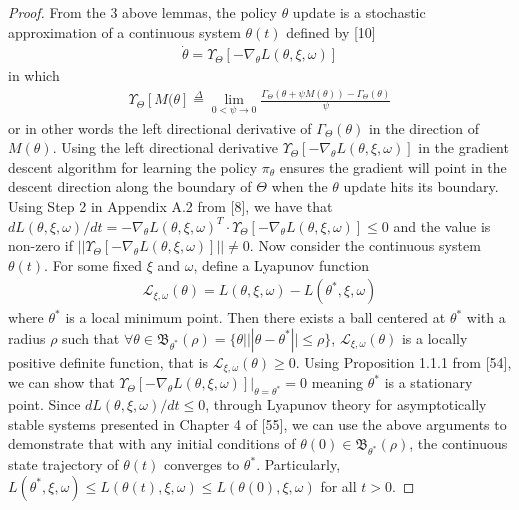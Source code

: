 \documentclass{article}
\theoremstyle{definition}
\begin{document}
\begin{proof}
From the $3$ above lemmas, the policy $\theta$ update is a stochastic approximation of a continuous system $\theta(t)$ defined by [10]
\begin{align}
\label{eqn:ThetaODE}
    \dot{\theta} = \Upsilon_\Theta[-\nabla_\theta L(\theta, \xi, \omega)]
\end{align}
in which
\begin{align*}
    \Upsilon_\Theta[M(\theta] \overset{\Delta}{=} \lim\limits_{0<\psi \to 0}\frac{\Gamma_\Theta(\theta + \psi M(\theta)) - \Gamma_\Theta(\theta)}{\psi}
\end{align*}
or in other words the left directional derivative of $\Gamma_\Theta(\theta)$ in the direction of $M(\theta)$. Using the left directional derivative $\Upsilon_\Theta[-\nabla_\theta L(\theta, \xi, \omega)]$ in the gradient descent algorithm for learning the policy $\pi_\theta$ ensures the gradient will point in the descent direction along the boundary of $\Theta$ when the $\theta$ update hits its boundary. Using Step 2 in Appendix A.2 from [8], we have that $dL(\theta,\xi,\omega)/dt=-\nabla_\theta L(\theta,\xi,\omega)^T\cdot\Upsilon_\Theta[-\nabla_\theta L(\theta, \xi, \omega)] \leq 0$ and the value is non-zero if $||\Upsilon_\Theta[-\nabla_\theta L(\theta, \xi, \omega)]|| \neq 0$. Now consider the continuous system $\theta(t)$. For some fixed $\xi$ and $\omega$, define a Lyapunov function
\begin{align*}
    \mathcal{L}_{\xi, \omega}(\theta) = L(\theta,\xi,\omega) - L(\theta^*, \xi, \omega)
\end{align*}
where $\theta^*$ is a local minimum point. Then there exists a ball centered at $\theta^*$ with a radius $\rho$ such that $\forall \theta\in \mathfrak{B}_{\theta^*}(\rho)=\{\theta | ||\theta - \theta^*|| \leq \rho  \}$, $\mathcal{L}_{\xi, \omega}(\theta)$ is a locally positive definite function, that is  $\mathcal{L}_{\xi, \omega}(\theta) \geq 0$. Using Proposition 1.1.1 from [54], we can show that $\Upsilon_\Theta[-\nabla_\theta L(\theta, \xi, \omega)]|_{\theta=\theta^*}=0$ meaning $\theta^*$ is a stationary point. Since $dL(\theta,\xi,\omega)/dt\leq 0$, through Lyapunov theory for asymptotically stable systems presented in Chapter 4 of [55], we can use the above arguments to demonstrate that with any initial conditions of $\theta(0)\in \mathfrak{B}_{\theta^*}(\rho)$, the continuous state trajectory of $\theta(t)$ converges to $\theta^*$. Particularly, $L(\theta^*,\xi,\omega) \leq L(\theta(t), \xi, \omega) \leq L(\theta(0), \xi, \omega)$ for all $t>0$.


\end{proof}
\end{document}
